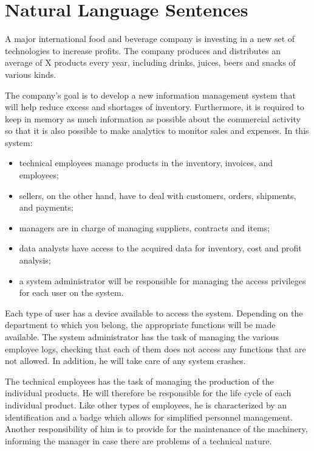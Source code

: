 \section{Natural Language Sentences}

A major international food and beverage company is investing in a new set of technologies to increase profits.
The company produces and distributes an average of X products every year, including drinks, juices, beers and snacks of various kinds.

The company's goal is to develop a new information management system that will help reduce excess and shortages of inventory. Furthermore, it is required to keep in memory as much information as possible about the commercial activity so that it is also possible to make analytics to monitor sales and expenses. In this system:
\begin{itemize}
    \item technical employees manage products in the inventory, invoices, and employees;
    \item sellers, on the other hand, have to deal with customers, orders, shipments, and payments;
    \item managers are in charge of managing suppliers, contracts and items;
    \item data analysts have access to the acquired data for inventory, cost and profit analysis;
    \item a system administrator will be responsible for managing the access privileges for each user on the system.
\end{itemize}

Each type of user has a device available to access the system. Depending on the department to which you belong, the appropriate functions will be made available. The system administrator has the task of managing the various employee logs, checking that each of them does not access any functions that are not allowed. In addition, he will take care of any system crashes.

The technical employees has the task of managing the production of the individual products. He will therefore be responsible for the life cycle of each individual product. Like other types of employees, he is characterized by an identification and a badge which allows for simplified personnel management. Another responsibility of him is to provide for the maintenance of the machinery, informing the manager in case there are problems of a technical nature.

